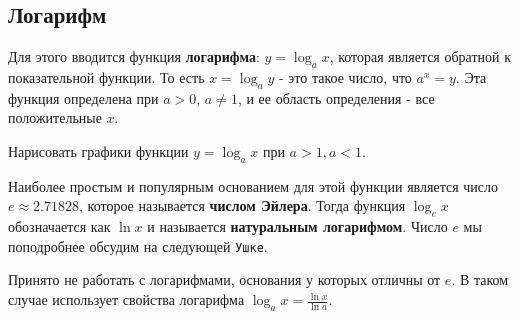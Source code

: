 \subsection{Логарифм}
Для этого вводится функция \textbf{логарифма}: $y = \log_a x$, которая является обратной к показательной функции. То есть $x = \log_a y$ - это такое число, что $a^x = y$.
Эта функция определена при $a > 0$, $a \neq 1$, и ее область определения - все положительные $x$. 
\begin{prac}
    Нарисовать графики функции $y = \log_a x$ при $a > 1, a < 1$.
\end{prac}
Наиболее простым и популярным основанием для этой функции является число $e \approx 2.71828$, которое называется \textbf{числом Эйлера}. Тогда функция $\log_e x$ обозначается как $\ln x$ и называется \textbf{натуральным логарифмом}. 
Число $e$ мы поподробнее обсудим на следующей \texttt{Ушке}.

\begin{remark}
    Принято не работать с логарифмами, основания у которых отличны от $e$. В таком случае использует свойства логарифма $\log_a x = \frac{\ln x}{\ln a}$.
\end{remark}
